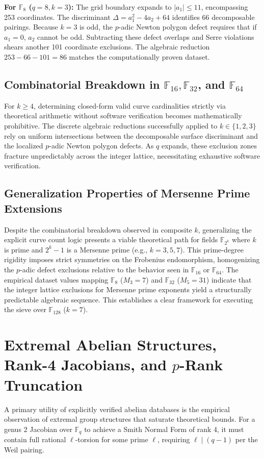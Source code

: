 \documentclass[letterpaper, 11pt]{article}
\begin{document}
\textbf{For $\mathbb{F}_8$ ($q=8, k=3$):}
The grid boundary expands to $|a_1| \le 11$, encompassing 253 coordinates. The discriminant $\Delta = a_1^2 - 4a_2 + 64$ identifies 66 decomposable pairings. Because $k=3$ is odd, the $p$-adic Newton polygon defect requires that if $a_1 = 0$, $a_2$ cannot be odd. Subtracting these defect overlaps and Serre violations shears another 101 coordinate exclusions. The algebraic reduction $253 - 66 - 101 = 86$ matches the computationally proven dataset.

\subsection{Combinatorial Breakdown in \texorpdfstring{$\mathbb{F}_{16}, \mathbb{F}_{32}$}{F\_16, F\_32}, and \texorpdfstring{$\mathbb{F}_{64}$}{F\_64}}
For $k \ge 4$, determining closed-form valid curve cardinalities strictly via theoretical arithmetic without software verification becomes mathematically prohibitive. The discrete algebraic reductions successfully applied to $k \in \{1, 2, 3\}$ rely on uniform intersections between the decomposable surface discriminant and the localized $p$-adic Newton polygon defects. As $q$ expands, these exclusion zones fracture unpredictably across the integer lattice, necessitating exhaustive software verification.

\subsection{Generalization Properties of Mersenne Prime Extensions}
Despite the combinatorial breakdown observed in composite $k$, generalizing the explicit curve count logic presents a viable theoretical path for fields $\mathbb{F}_{2^k}$ where $k$ is prime and $2^k - 1$ is a Mersenne prime (e.g., $k=3, 5, 7$). This prime-degree rigidity imposes strict symmetries on the Frobenius endomorphism, homogenizing the $p$-adic defect exclusions relative to the behavior seen in $\mathbb{F}_{16}$ or $\mathbb{F}_{64}$. The empirical dataset values mapping $\mathbb{F}_8$ ($M_3=7$) and $\mathbb{F}_{32}$ ($M_5=31$) indicate that the integer lattice exclusions for Mersenne prime exponents yield a structurally predictable algebraic sequence. This establishes a clear framework for executing the sieve over $\mathbb{F}_{128}$ ($k=7$).

\section{Extremal Abelian Structures, Rank-4 Jacobians, and \texorpdfstring{$p$}{p}-Rank Truncation}
A primary utility of explicitly verified abelian databases is the empirical observation of extremal group structures that saturate theoretical bounds. For a genus 2 Jacobian over $\mathbb{F}_q$ to achieve a Smith Normal Form of rank 4, it must contain full rational $\ell$-torsion for some prime $\ell$, requiring $\ell \mid (q-1)$ per the Weil pairing. 
\end{document}
